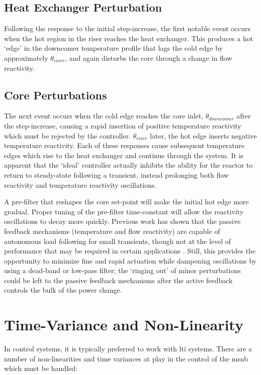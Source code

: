 \subsection{Heat Exchanger Perturbation}
Following the response to the initial step-increase, the first notable event occurs when the hot region in the riser reaches the heat exchanger. This produces a hot `edge' in the downcomer temperature profile that lags the cold edge by approximately $\theta_{riser}$, and again disturbs the core through a change in flow reactivity.

\subsection{Core Perturbations}
The next event occurs when the cold edge reaches the core inlet, $\theta_{downcomer}$ after the step-increase, causing a rapid insertion of positive temperature reactivity which must be rejected by the controller. $\theta_{riser}$ later, the hot edge inserts negative temperature reactivity. Each of these responses cause subsequent temperature edges which rise to the heat exchanger and continue through the system. It is apparent that the `ideal' controller actually inhibits the ability for the reactor to return to steady-state following a transient, instead prolonging both flow reactivity and temperature reactivity oscillations.

A pre-filter that reshapes the core set-point will make the initial hot edge more gradual. Proper tuning of the pre-filter time-constant will allow the reactivity oscillations to decay more quickly. Previous work has shown that the passive feedback mechanisms (temperature and flow reactivity) are capable of autonomous load following for small transients, though not at the level of performance that may be required in certain applications \cite{CarterNumerical}. Still, this provides the opportunity to minimize fine and rapid actuation while dampening oscillations by using a dead-band or low-pass filter; the `ringing out' of minor perturbations could be left to the passive feedback mechanisms after the active feedback controls the bulk of the power change.

\section{Time-Variance and Non-Linearity}
In control systems, it is typically preferred to work with \acf{lti} systems. There are a number of non-linearities and time variances at play in the control of the \acs{msnb} which must be handled:

